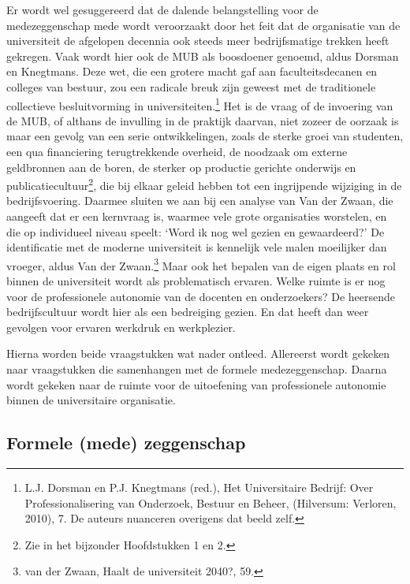 \documentclass[empirical, authordate, ]{new-jote-article}
\begin{document}
	Er wordt wel gesuggereerd dat de dalende belangstelling voor de medezeggenschap mede wordt veroorzaakt door het feit dat de organisatie van de universiteit de afgelopen decennia ook steeds meer bedrijfsmatige trekken heeft gekregen. Vaak wordt hier ook de MUB als boosdoener genoemd, aldus Dorsman en Knegtmans. Deze wet, die een grotere macht gaf aan faculteitsdecanen en colleges van bestuur, zou een radicale breuk zijn geweest met de traditionele collectieve besluitvorming in universiteiten.\footnote{L.J. Dorsman en P.J. Knegtmans (red.), Het Universitaire Bedrijf: Over Professionalisering van Onderzoek, Bestuur en Beheer, (Hilversum: Verloren, 2010), 7. De auteurs nuanceren overigens dat beeld zelf.} Het is de vraag of de invoering van de MUB, of althans de invulling in de praktijk daarvan, niet zozeer de oorzaak is maar een gevolg van een serie ontwikkelingen, zoals de sterke groei van studenten, een qua financiering terugtrekkende overheid, de noodzaak om externe geldbronnen aan de boren, de sterker op productie gerichte onderwijs en publicatiecultuur\footnote{Zie in het bijzonder Hoofdstukken 1 en 2.}, die bij elkaar geleid hebben tot een ingrijpende wijziging in de bedrijfsvoering. Daarmee sluiten we aan bij een analyse van Van der Zwaan, die aangeeft dat er een kernvraag is, waarmee vele grote organisaties worstelen, en die op individueel niveau speelt: ‘Word ik nog wel gezien en gewaardeerd?' De identificatie met de moderne universiteit is kennelijk vele malen moeilijker dan vroeger, aldus Van der Zwaan.\footnote{van der Zwaan, Haalt de universiteit 2040?, 59.} Maar ook het bepalen van de eigen plaats en rol binnen de universiteit wordt als problematisch ervaren. Welke ruimte is er nog voor de professionele autonomie van de docenten en onderzoekers? De heersende bedrijfscultuur wordt hier als een bedreiging gezien. En dat heeft dan weer gevolgen voor ervaren werkdruk en werkplezier.



	Hierna worden beide vraagstukken wat nader ontleed. Allereerst wordt gekeken naar vraagstukken die samenhangen met de formele medezeggenschap. Daarna wordt gekeken naar de ruimte voor de uitoefening van professionele autonomie binnen de universitaire organisatie.



	\subsection{Formele (mede) zeggenschap}
\end{document}
